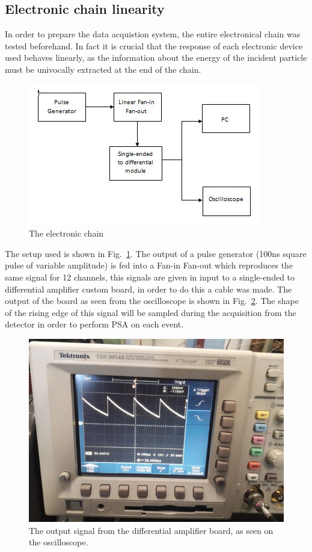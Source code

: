 \subsection{Electronic chain linearity}

In order to prepare the data acquistion system, the entire electronical chain
was tested beforehand. In fact it is crucial that the response of each
electronic device used behaves linearly, as the information about the energy
of the incident particle must be univocally extracted at the end of the chain.

\begin{figure}[h]
  \centering
  \includegraphics[scale=.5]{img/electronic_chain_diagram.JPG}
  \caption{The electronic chain}
  \label{chain}
\end{figure}

The setup used is shown in Fig.~\ref{chain}. The output of a pulse generator (\num{100}ns square pulse of variable amplitude) is fed into a Fan-in Fan-out which reproduces the same signal for 12 channels, this signals are given in input to a single-ended to differential amplifier custom board, in order to do this a cable was made.
The output of the board as seen from the oscilloscope is shown in Fig.~\ref{osc}. The shape of the rising edge of this signal will be sampled during the acquisition from the detector in order to perform PSA on each event.


\begin{figure}[h]
  \centering
  \includegraphics[scale=.35]{img/test_signal_oscilloscope.JPG}
  \caption{The output signal from the differential amplifier board, as seen on the oscilloscope.}
  \label{osc}
\end{figure}

